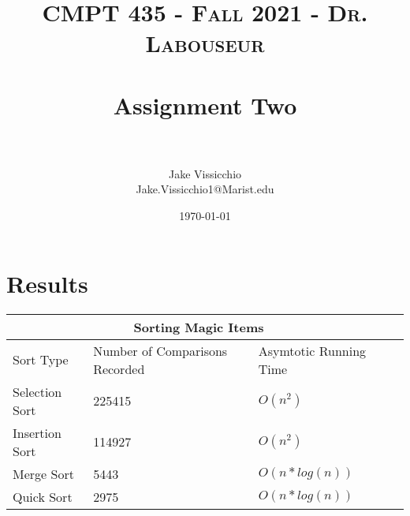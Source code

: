 \documentclass[letterpaper, 10pt]{article}
\title{	
   \normalfont\normalsize 
   \textsc{CMPT 435 - Fall 2021 - Dr. Labouseur} \\[10pt] %
   \horrule{0.5pt} \\[0.25cm] 	%
   \huge Assignment Two \\   %
   \horrule{0.5pt} \\[0.25cm] 	%
}
\author{Jake Vissicchio \\ \normalsize Jake.Vissicchio1@Marist.edu}
\date{\normalsize\today} 	%
\begin{document}
\maketitle %



\section{Results}

\noindent



\begin{tabular}{ |p{4cm}||p{4cm}|p{4cm}|p{4cm}|  }
 \hline
 \multicolumn{3}{|c|}{Sorting Magic Items} \\
 \hline
 Sort Type& Number of Comparisons Recorded & Asymtotic Running Time\\
 \hline
 Selection Sort   & 225415    & $O(n^2)$\\
 Insertion Sort&   114927 & $O(n^2)$   \\
 Merge Sort & 5443 & $O(n*log(n))$\\
 Quick Sort    & 2975 & $O(n*log(n))$\\
 \hline
\end{tabular}
\\
\end{document}
